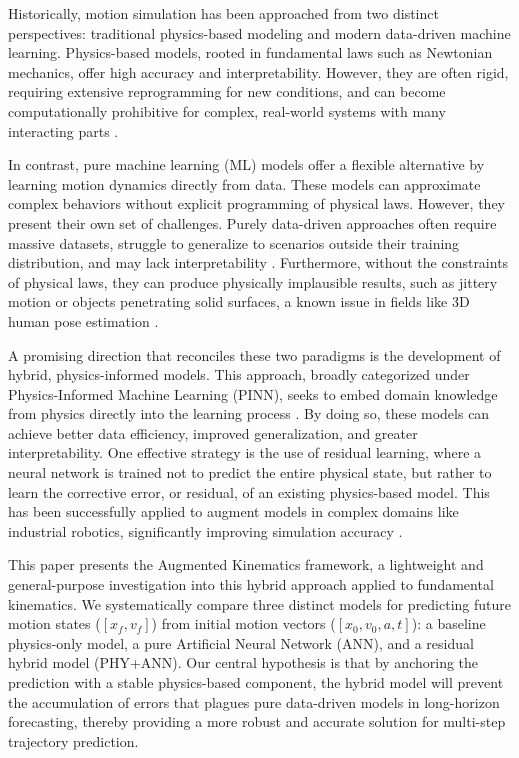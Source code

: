 \documentclass[conference]{IEEEtran}
\begin{document}
Historically, motion simulation has been approached from two distinct perspectives: traditional physics-based modeling and modern data-driven machine learning. Physics-based models, rooted in fundamental laws such as Newtonian mechanics, offer high accuracy and interpretability. However, they are often rigid, requiring extensive reprogramming for new conditions, and can become computationally prohibitive for complex, real-world systems with many interacting parts \cite{b3, b4}.

In contrast, pure machine learning (ML) models offer a flexible alternative by learning motion dynamics directly from data. These models can approximate complex behaviors without explicit programming of physical laws. However, they present their own set of challenges. Purely data-driven approaches often require massive datasets, struggle to generalize to scenarios outside their training distribution, and may lack interpretability \cite{b5}. Furthermore, without the constraints of physical laws, they can produce physically implausible results, such as jittery motion or objects penetrating solid surfaces, a known issue in fields like 3D human pose estimation \cite{b6}.

A promising direction that reconciles these two paradigms is the development of hybrid, physics-informed models. This approach, broadly categorized under Physics-Informed Machine Learning (PINN), seeks to embed domain knowledge from physics directly into the learning process \cite{b7}. By doing so, these models can achieve better data efficiency, improved generalization, and greater interpretability. One effective strategy is the use of residual learning, where a neural network is trained not to predict the entire physical state, but rather to learn the corrective error, or residual, of an existing physics-based model. This has been successfully applied to augment models in complex domains like industrial robotics, significantly improving simulation accuracy \cite{b8}.

This paper presents the Augmented Kinematics framework, a lightweight and general-purpose investigation into this hybrid approach applied to fundamental kinematics. We systematically compare three distinct models for predicting future motion states ($[x_f, v_f]$) from initial motion vectors ($[x_0, v_0, a, t]$): a baseline physics-only model, a pure Artificial Neural Network (ANN), and a residual hybrid model (PHY+ANN). Our central hypothesis is that by anchoring the prediction with a stable physics-based component, the hybrid model will prevent the accumulation of errors that plagues pure data-driven models in long-horizon forecasting, thereby providing a more robust and accurate solution for multi-step trajectory prediction.
\end{document}
